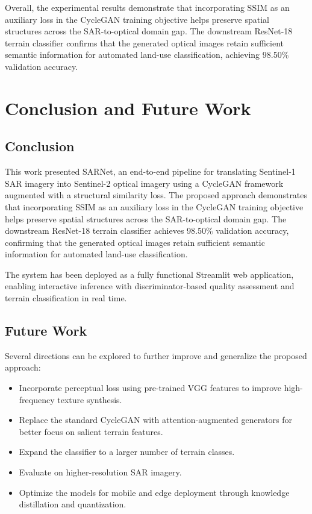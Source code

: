\documentclass[conference]{IEEEtran}
\begin{document}
Overall, the experimental results demonstrate that incorporating SSIM as an auxiliary loss in the CycleGAN training objective helps preserve spatial structures across the SAR-to-optical domain gap. The downstream ResNet-18 terrain classifier confirms that the generated optical images retain sufficient semantic information for automated land-use classification, achieving 98.50\% validation accuracy.

\section{Conclusion and Future Work}

\subsection{Conclusion}

This work presented SARNet, an end-to-end pipeline for translating Sentinel-1 SAR imagery into Sentinel-2 optical imagery using a CycleGAN framework augmented with a structural similarity loss. The proposed approach demonstrates that incorporating SSIM as an auxiliary loss in the CycleGAN training objective helps preserve spatial structures across the SAR-to-optical domain gap. The downstream ResNet-18 terrain classifier achieves 98.50\% validation accuracy, confirming that the generated optical images retain sufficient semantic information for automated land-use classification.

The system has been deployed as a fully functional Streamlit web application, enabling interactive inference with discriminator-based quality assessment and terrain classification in real time.

\subsection{Future Work}

Several directions can be explored to further improve and generalize the proposed approach:
\begin{itemize}
    \item Incorporate perceptual loss using pre-trained VGG features to improve high-frequency texture synthesis.
    \item Replace the standard CycleGAN with attention-augmented generators for better focus on salient terrain features.
    \item Expand the classifier to a larger number of terrain classes.
    \item Evaluate on higher-resolution SAR imagery.
    \item Optimize the models for mobile and edge deployment through knowledge distillation and quantization.
\end{itemize}
\end{document}
